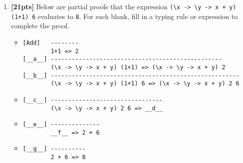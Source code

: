 \documentclass[paper=letter, fontsize=13pt]{article} %
\numberwithin{equation}{section} %
\begin{document}
\begin{enumerate}
\begin{verbatim}
          e => e'
[App-R] ------------
        v e => v e'        
        
[App]   (\x -> e) v => e[x := v]          

               e1 => e1'
[Add-L]   --------------------
          e1 + e2 => e1' + e2

              e2 => e2'
[Add-R]   --------------------
          n1 + e2 => n1 + e2'
          
[Add]     n1 + n2 => n       where n == n1 + n2          

                        e1 => e1'
[Let-Def] --------------------------------------
          let x = e1 in e2 => let x = e1' in e2
        
[Let]     let x = v in e2 => e2[x := v]
\end{verbatim}


\begin{verbatim}
\end{verbatim}
\newpage
\item \textbf{[21pts]}  
Below are partial proofs that the expression 
\verb|(\x -> \y -> x + y) (1+1) 6|
evaluates to \texttt{8}.
For each blank, fill in a typing rule or expression to complete the proof.
\bigskip

\begin{itemize}
  \item
\begin{verbatim}
[Add]   --------
        1+1 => 2
[__a__] -------------------------------------------------
        (\x -> \y -> x + y) (1+1) => (\x -> \y -> x + y) 2
[__b__] ------------------------------------------------------
        (\x -> \y -> x + y) (1+1) 6 => (\x -> \y -> x + y) 2 6
\end{verbatim}
\bigskip
\bigskip
\bigskip
\bigskip
\item
\begin{verbatim}
[__c__] --------------------------------
        (\x -> \y -> x + y) 2 6 => __d__
\end{verbatim}
\bigskip
\bigskip
\bigskip
\bigskip

      \item
\begin{verbatim}
[__e__] --------------
        __f__ => 2 + 6
\end{verbatim}
\bigskip
\bigskip
\bigskip
\bigskip

\item
\begin{verbatim}
[__g__] ----------
        2 + 6 => 8
\end{verbatim}
\bigskip
\bigskip
\bigskip
\bigskip
\end{itemize}


\end{enumerate}
\end{document}
